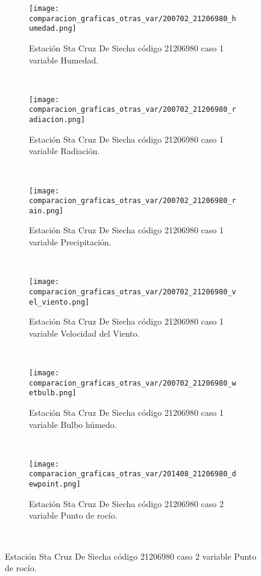 \begin{figure}[H]
\centering
\begin{subfigure}[normla]{0.4\textwidth}
\caption{Estación Sta Cruz De Siecha código 21206980 caso 1 variable Humedad.}
\texttt{[image: comparacion\_graficas\_otras\_var/200702\_21206980\_humedad.png]}
\end{subfigure}
~
\begin{subfigure}[normla]{0.4\textwidth}
\caption{Estación Sta Cruz De Siecha código 21206980 caso 1 variable Radiación.}
\texttt{[image: comparacion\_graficas\_otras\_var/200702\_21206980\_radiacion.png]}
\end{subfigure}
~
\begin{subfigure}[normla]{0.4\textwidth}
\caption{Estación Sta Cruz De Siecha código 21206980 caso 1 variable Precipitación.}
\texttt{[image: comparacion\_graficas\_otras\_var/200702\_21206980\_rain.png]}
\end{subfigure}
~
\begin{subfigure}[normla]{0.4\textwidth}
\caption{Estación Sta Cruz De Siecha código 21206980 caso 1 variable Velocidad del Viento.}
\texttt{[image: comparacion\_graficas\_otras\_var/200702\_21206980\_vel\_viento.png]}
\end{subfigure}
~
\begin{subfigure}[normla]{0.4\textwidth}
\caption{Estación Sta Cruz De Siecha código 21206980 caso 1 variable Bulbo húmedo.}
\texttt{[image: comparacion\_graficas\_otras\_var/200702\_21206980\_wetbulb.png]}
\end{subfigure}
~
\begin{subfigure}[normla]{0.4\textwidth}
\caption{Estación Sta Cruz De Siecha código 21206980 caso 2 variable Punto de rocío.}
\texttt{[image: comparacion\_graficas\_otras\_var/201408\_21206980\_dewpoint.png]}
\end{subfigure}
~
\end{figure}
           

